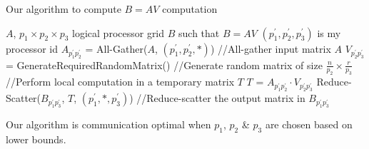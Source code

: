\documentclass[aspectratio=169]{beamer}
\begin{document}
	\begin{frame}{Our algorithm to compute $B=AV$ computation}
		\vspace*{-0.35cm}\begin{algorithm}[H]
			\caption{$B=AV$ computation}
			\begin{algorithmic}[1]
				\REQUIRE $A$, $p_1 \times p_2 \times p_3$ logical processor grid
				\ENSURE $B$ such that $B=AV$
				\STATE $(p_1^\prime, p_2^\prime, p_3^\prime)$ is my processor id
				\STATE $A_{p_1^\prime p_2^\prime}$ = All-Gather($A$, $(p_1^\prime, p_2^\prime, * )$)\label{alg:BAV:line:allGatherInputMatrix} \qquad\quad //All-gather input matrix $A$
				\STATE $V_{p_2^\prime p_3^\prime}$ =  GenerateRequiredRandomMatrix() \quad\quad //Generate random matrix of size $\frac{n}{p_2}\times \frac{r}{p_3}$
				\STATE //Perform local computation in a temporary matrix $T$
				\STATE $T$ = $A_{p_1^\prime p_2^\prime} \cdot V_{p_2^\prime p_3^\prime}$
				\STATE Reduce-Scatter($B_{p_1^\prime p_3^\prime}$, $T$, $(p_1^\prime, *,  p_3^\prime)$) \qquad\quad //Reduce-scatter the output matrix in $B_{p_1^\prime p_3^\prime}$
			\end{algorithmic}
		\end{algorithm}
	\vfill
	Our algorithm is communication optimal when $p_1$, $p_2$ \& $p_3$ are chosen based on lower bounds.
	\vfill
	\end{frame}
\end{document}
